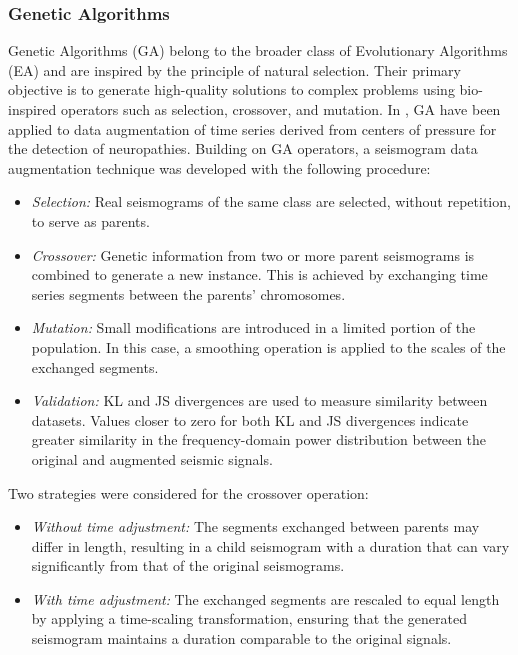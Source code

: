 \documentclass[journal]{IEEEtran}
\begin{document}
\subsubsection{Genetic Algorithms}
Genetic Algorithms (GA) belong to the broader class of Evolutionary Algorithms (EA) and are inspired by the principle of natural selection. Their primary objective is to generate high-quality solutions to complex problems using bio-inspired operators such as selection, crossover, and mutation\cite{nethravathi2017augmentation}. In \cite{villegas2024data}, GA have been applied to data augmentation of time series derived from centers of pressure for the detection of neuropathies.
Building on GA operators, a seismogram data augmentation technique was developed with the following procedure:
\begin{itemize}
\item \textit{Selection:} Real seismograms of the same class are selected, without repetition, to serve as parents.
\item \textit{Crossover:} Genetic information from two or more parent seismograms is combined to generate a new instance. This is achieved by exchanging time series segments between the parents’ chromosomes.
\item \textit{Mutation:} Small modifications are introduced in a limited portion of the population. In this case, a smoothing operation is applied to the scales of the exchanged segments.
\item \textit{Validation:} KL and JS divergences are used to measure similarity between datasets. Values closer to zero for both KL and JS divergences indicate greater similarity in the frequency-domain power distribution between the original and augmented seismic signals.
\end{itemize}
Two strategies were considered for the crossover operation:
\begin{itemize}
\item \textit{Without time adjustment:} The segments exchanged between parents may differ in length, resulting in a child seismogram with a duration that can vary significantly from that of the original seismograms.
\item \textit{With time adjustment:} The exchanged segments are rescaled to equal length by applying a time-scaling transformation, ensuring that the generated seismogram maintains a duration comparable to the original signals.
\end{itemize}
\end{document}
